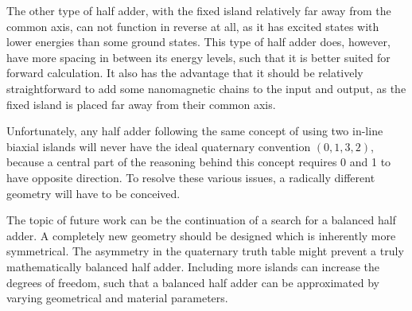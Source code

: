 \documentclass[11pt,a4paper,english]{article}
\begin{document}
The other type of half adder, with the fixed island relatively far away from the common axis, can not function in reverse at all, as it has excited states with lower energies than some ground states. This type of half adder does, however, have more spacing in between its energy levels, such that it is better suited for forward calculation. It also has the advantage that it should be relatively straightforward to add some nanomagnetic chains to the input and output, as the fixed island is placed far away from their common axis. \par
Unfortunately, any half adder following the same concept of using two in-line biaxial islands will never have the ideal quaternary convention $(0,1,3,2)$, because a central part of the reasoning behind this concept requires 0 and 1 to have opposite direction. To resolve these various issues, a radically different geometry will have to be conceived. \par
The topic of future work can be the continuation of a search for a balanced half adder. A completely new geometry should be designed which is inherently more symmetrical. The asymmetry in the quaternary truth table might prevent a truly mathematically balanced half adder. Including more islands can increase the degrees of freedom, such that a balanced half adder can be approximated by varying geometrical and material parameters.


\newpage


\end{document}
